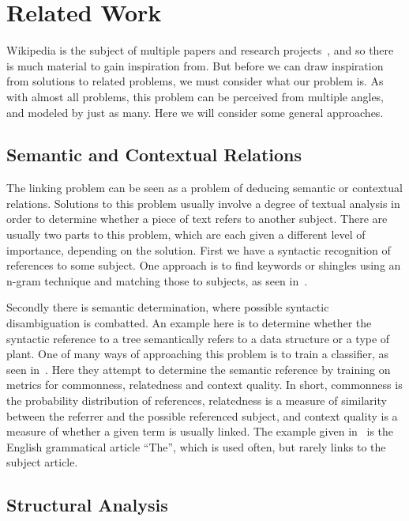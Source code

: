 \section{Related Work}\label{sec:related_work}

Wikipedia is the subject of multiple papers and research projects~\cite{wiki-research-newsletter}, and so there is much material to gain inspiration from. But before we can draw inspiration from solutions to related problems, we must consider what our problem is. As with almost all problems, this problem can be perceived from multiple angles, and modeled by just as many. Here we will consider some general approaches.

\subsection{Semantic and Contextual Relations}\label{related_semantic_contextual}

The linking problem can be seen as a problem of deducing semantic or contextual relations. Solutions to this problem usually involve a degree of textual analysis in order to determine whether a piece of text refers to another subject. There are usually two parts to this problem, which are each given a different level of importance, depending on the solution. First we have a syntactic recognition of references to some subject. One approach is to find keywords or shingles using an n-gram technique and matching those to subjects, as seen in~\cite{mihalcea2007wikify}. 

Secondly there is semantic determination, where possible syntactic disambiguation is combatted. An example here is to determine whether the syntactic reference to a tree semantically refers to a data structure or a type of plant. One of many ways of approaching this problem is to train a classifier, as seen in~\cite{milne2008learning}. Here they attempt to determine the semantic reference by training on metrics for commonness, relatedness and context quality. In short, commonness is the probability distribution of references, relatedness is a measure of similarity between the referrer and the possible referenced subject, and context quality is a measure of whether a given term is usually linked. The example given in~\cite{milne2008learning} is the English grammatical article \enquote{The}, which is used often, but rarely links to the subject article.

\subsection{Structural Analysis}\label{related_structural_analysis}

